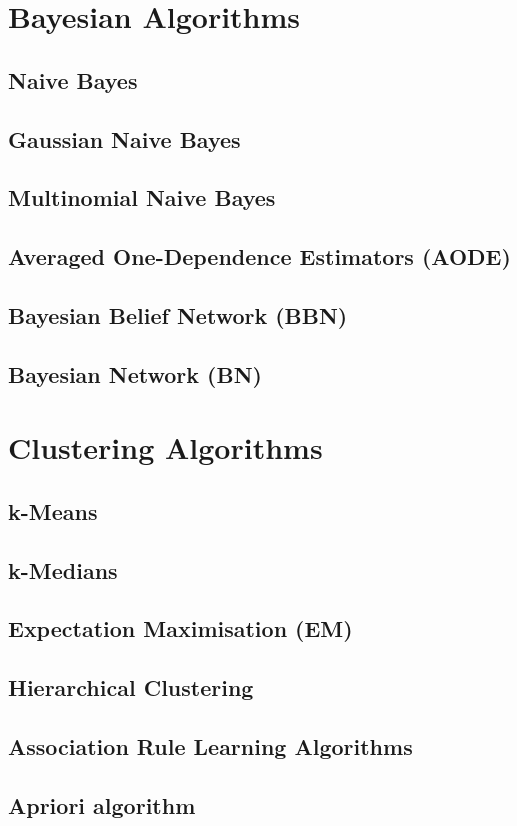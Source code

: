 \documentclass[14pt]{book}
\begin{document}
\chapter{Bayesian Algorithms}
\section{Naive Bayes}
\section{Gaussian Naive Bayes}
\section{Multinomial Naive Bayes}
\section{Averaged One-Dependence Estimators (AODE)}
\section{Bayesian Belief Network (BBN)}
\section{Bayesian Network (BN)}
\chapter{Clustering Algorithms}
\section{k-Means}
\section{k-Medians}
\section{Expectation Maximisation (EM)}
\section{Hierarchical Clustering}
\section{Association Rule Learning Algorithms}
\section{Apriori algorithm}
\end{document}
